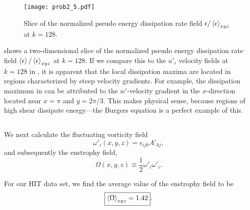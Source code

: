 \documentclass[11pt]{article}
\begin{document}
\subsection{}

\begin{figure}[t]
\centering
\texttt{[image: prob2\_5.pdf]}
\\[6pt]
\caption{Slice of the normalized pseudo energy dissipation rate field $\epsilon / \left< \epsilon \right>_{xyz}$ at $k=128$.}
\label{fig:prob_2_5_epsilon_normalized_slice}
\end{figure}

 shows a two-dimensional slice of the normalized pseudo energy dissipation rate field $\left< \epsilon \right>/\left< \epsilon \right>_{xyz}$ at $k=128$. If we compare this to the $u'_i$ velocity fields at $k=128$ in , it is apparent that the local dissipation maxima are located in regions characterized by steep velocity gradients. For example, the dissipation maximum in  can be attributed to the $w'$-velocity gradient in the $x$-direction located near $x=\pi$ and $y=2\pi/3$. This makes physical sense, because regions of high shear dissipate energy---the Burgers equation is a perfect example of this.

\subsection{}

We next calculate the fluctuating vorticity field
\begin{equation}
\omega'_i(x,y,z)
=
\epsilon_{ijk} A'_{kj}
,
\end{equation}
and subsequently the enstrophy field,
\begin{equation}
\Omega(x,y,z)
\equiv
\frac{1}{2} \omega'_i \omega'_i
.
\end{equation}

For our HIT data set, we find the average value of the enstrophy field to be
\[
\boxed{\left< \Omega \right>_{xyz} = 1.42}
.
\]

\subsection{}
\end{document}
